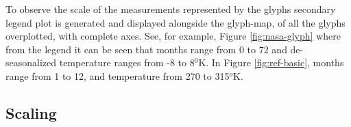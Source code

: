 \documentclass[oneside]{article}
\begin{document}
To observe the scale of the measurements represented by the glyphs secondary legend plot is generated and displayed alongside the glyph-map, of all the glyphs overplotted, with complete axes. See, for example, Figure \ref{fig:nasa-glyph} where from the legend it can be seen that months range from 0 to 72 and de-seasonalized temperature ranges from -8 to 8$^0$K. In Figure \ref{fig:ref-basic}, months range from 1 to 12, and temperature from 270 to 315$^o$K.





\subsection{Scaling}~\label{sec:scale}

\end{document}
